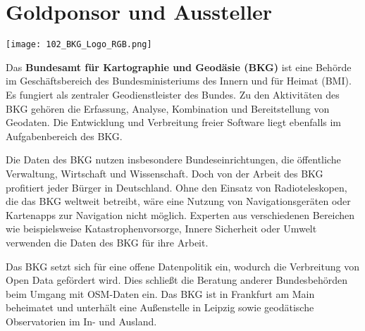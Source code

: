 \section*{Goldponsor und Aussteller}
\begin{flushright}
\texttt{[image: 102\_BKG\_Logo\_RGB.png]}
\end{flushright}
\vspace{-0.5cm}

\noindent
Das {\bfseries Bundesamt für Kartographie und Geodäsie (BKG)} ist eine Behörde im Geschäftsbereich des Bundesministeriums des Innern und für Heimat (BMI). Es fungiert als zentraler Geodienstleister des Bundes. Zu den Aktivitäten des BKG gehören die Erfassung, Analyse, Kombination und Bereitstellung von Geodaten. Die Entwicklung und Verbreitung freier Software liegt ebenfalls im Aufgabenbereich des BKG.

\noindent
Die Daten des BKG nutzen insbesondere Bundeseinrichtungen, die öffentliche Verwaltung, Wirtschaft und Wissenschaft. Doch von der Arbeit des BKG profitiert jeder Bürger in Deutschland. Ohne den Einsatz von Radioteleskopen, die das BKG weltweit betreibt, wäre eine Nutzung von Navigationsgeräten oder Kartenapps zur Navigation nicht möglich. Experten aus verschiedenen Bereichen wie beispielsweise Katastrophenvorsorge, Innere Sicherheit oder Umwelt verwenden die Daten des BKG für ihre Arbeit. 

\noindent
Das BKG setzt sich für eine offene Datenpolitik ein, wodurch die Verbreitung von Open Data gefördert wird. Dies schließt die Beratung anderer Bundesbehörden beim Umgang mit OSM-Daten ein.
Das BKG ist in Frankfurt am Main beheimatet und unterhält eine Außenstelle in Leipzig sowie geodätische Observatorien im In- und Ausland.

